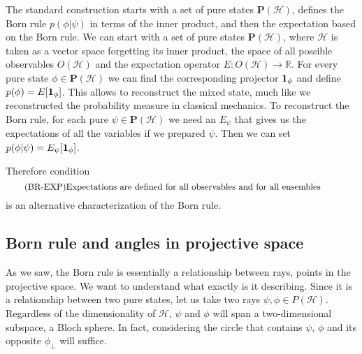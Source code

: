 The standard construction starts with a set of pure states $\mathbf{P}(\mathcal{H})$, defines the Born rule $p(\phi | \psi)$ in terms of the inner product, and then the expectation based on the Born rule. We can start with a set of pure states $\mathbf{P}(\mathcal{H})$, where $\mathcal{H}$ is taken as a vector space forgetting its inner product, the space of all possible observables $O(\mathcal{H})$ and the expectation operator $E : O(\mathcal{H}) \to \mathbb{R}$. For every pure state $\phi \in \mathbf{P}(\mathcal{H})$ we can find the corresponding projector $\indicator[\phi]$ and define $p(\phi) = E[\indicator[\phi]]$. This allows to reconstruct the mixed state, much like we reconstructed the probability measure in classical mechanics. To reconstruct the Born rule, for each pure $\psi \in \mathbf{P}(\mathcal{H})$ we need an $E_{\psi}$ that gives us the expectations of all the variables if we prepared $\psi$. Then we can set $p(\phi | \psi) = E_{\psi}[\indicator[\phi]]$.

Therefore condition
\begin{equation}\label{rp-qm-br-condExpectations}
	\tag{BR-EXP}
	\eqtext{Expectations are defined for all observables and for all ensembles} 
\end{equation}
is an alternative characterization of the Born rule.

\subsection{Born rule and angles in projective space}

As we saw, the Born rule is essentially a relationship between rays, points in the projective space. We want to understand what exactly is it describing. Since it is a relationship between two pure states, let us take two rays $\psi, \phi \in P(\mathcal{H})$. Regardless of the dimensionality of $\mathcal{H}$, $\psi$ and $\phi$ will span a two-dimensional subspace, a Bloch sphere. In fact, considering the circle that contains $\psi$, $\phi$ and its opposite  $\phi_{\perp}$ will suffice.

